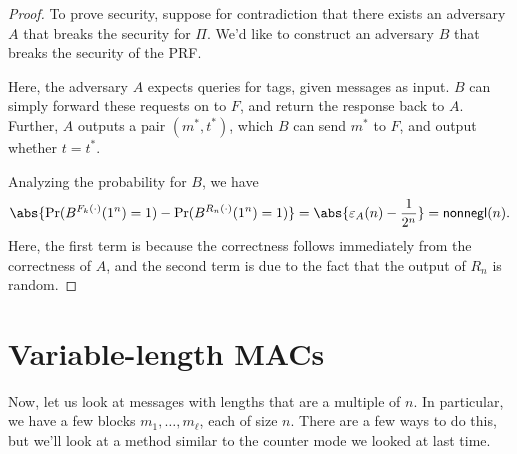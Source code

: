 \begin{proof}
    To prove security, suppose for contradiction that there exists an adversary $A$ that breaks the security for $\Pi$. We'd like to construct an adversary $B$ that breaks the security of the PRF.

    Here, the adversary $A$ expects queries for tags, given messages as input. $B$ can simply forward these requests on to $F$, and return the response back to $A$. Further, $A$ outputs a pair $(m^*, t^*)$, which $B$ can send $m^*$ to $F$, and output whether $t = t^*$.

    \begin{center}
    \end{center}

    Analyzing the probability for $B$, we have
    \[
        \abs{\Pr(B^{F_k(\cdot)}(1^n) = 1) - \Pr(B^{R_n(\cdot)}(1^n) = 1)}
        = \abs{\varepsilon_A(n) - \frac{1}{2^n}}
        = \nonnegl(n)
    .\]
    Here, the first term is because the correctness follows immediately from the correctness of $A$, and the second term is due to the fact that the output of $R_n$ is random.
\end{proof}

\section{Variable-length MACs}

Now, let us look at messages with lengths that are a multiple of $n$. In particular, we have a few blocks $m_1, \ldots, m_{\ell}$, each of size $n$. There are a few ways to do this, but we'll look at a method similar to the counter mode we looked at last time.

